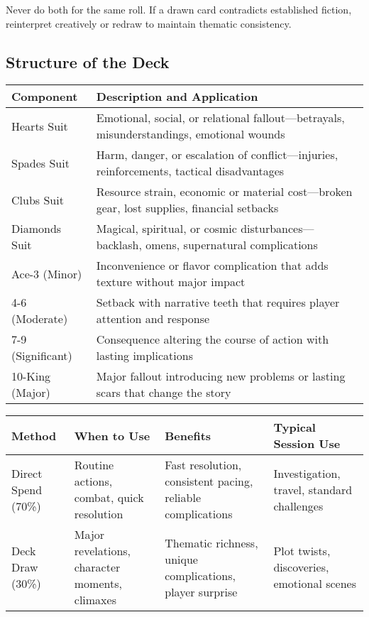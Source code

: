 Never do both for the same roll. If a drawn card contradicts established fiction, reinterpret creatively or redraw to maintain thematic consistency.

\subsection*{Structure of the Deck}

\begin{fatebox}
\begin{tabularx}{\textwidth}{lX}
\toprule
\textbf{Component} & \textbf{Description and Application} \\
\midrule
Hearts Suit & Emotional, social, or relational fallout—betrayals, misunderstandings, emotional wounds \\
Spades Suit & Harm, danger, or escalation of conflict—injuries, reinforcements, tactical disadvantages \\
Clubs Suit & Resource strain, economic or material cost—broken gear, lost supplies, financial setbacks \\
Diamonds Suit & Magical, spiritual, or cosmic disturbances—backlash, omens, supernatural complications \\
Ace-3 (Minor) & Inconvenience or flavor complication that adds texture without major impact \\
4-6 (Moderate) & Setback with narrative teeth that requires player attention and response \\
7-9 (Significant) & Consequence altering the course of action with lasting implications \\
10-King (Major) & Major fallout introducing new problems or lasting scars that change the story \\
\bottomrule
\end{tabularx}
\end{fatebox}

\begin{fatebox}
\begin{tabularx}{\textwidth}{lXXX}
\toprule
\textbf{Method} & \textbf{When to Use} & \textbf{Benefits} & \textbf{Typical Session Use} \\
\midrule
Direct Spend (70\%) & Routine actions, combat, quick resolution & Fast resolution, consistent pacing, reliable complications & Investigation, travel, standard challenges \\
Deck Draw (30\%) & Major revelations, character moments, climaxes & Thematic richness, unique complications, player surprise & Plot twists, discoveries, emotional scenes \\
\bottomrule
\end{tabularx}
\end{fatebox}

